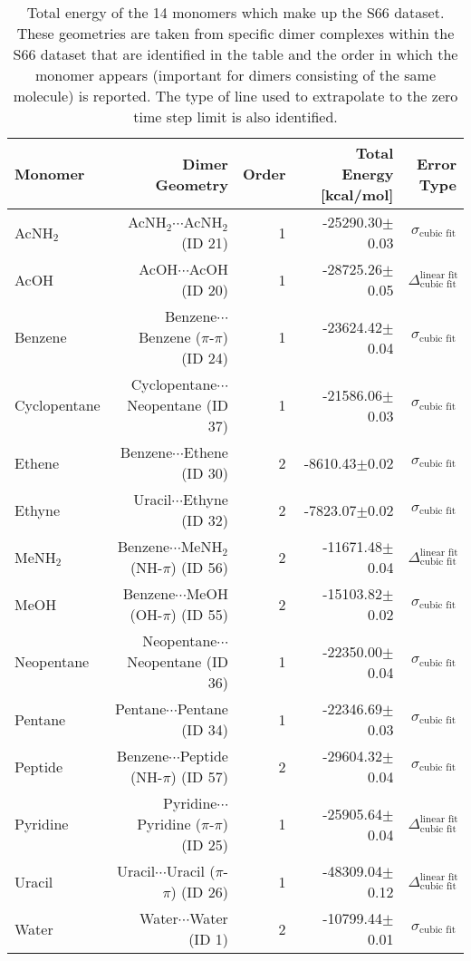 \begin{table}
\caption{\label{tab:monomer_tot_ene}Total energy of the 14 monomers which make up the S66 dataset. These geometries are taken from specific dimer complexes within the S66 dataset that are identified in the table and the order in which the monomer appears (important for dimers consisting of the same molecule) is reported. The type of line used to extrapolate to the zero time step limit is also identified.}
\begin{adjustbox}{center}
\begin{tabular}{lrrrr}
\toprule
Monomer & Dimer Geometry & Order & Total Energy [kcal/mol] & Error Type \\ 
\midrule
AcNH$_2$ & AcNH$_2$$\cdots$AcNH$_2$ (ID 21) & 1 & -25290.30$\pm$0.03 & $\sigma_\text{cubic fit}$ \\
AcOH & AcOH$\cdots$AcOH (ID 20) & 1 & -28725.26$\pm$0.05 & $\Delta_\text{cubic fit}^\text{linear fit}$ \\
Benzene & Benzene$\cdots$Benzene ($\pi$-$\pi$) (ID 24) & 1 & -23624.42$\pm$0.04 & $\sigma_\text{cubic fit}$ \\
Cyclopentane & Cyclopentane$\cdots$Neopentane (ID 37) & 1 & -21586.06$\pm$0.03 & $\sigma_\text{cubic fit}$ \\
Ethene & Benzene$\cdots$Ethene (ID 30) & 2 & -8610.43$\pm$0.02 & $\sigma_\text{cubic fit}$ \\
Ethyne & Uracil$\cdots$Ethyne (ID 32) & 2 & -7823.07$\pm$0.02 & $\sigma_\text{cubic fit}$ \\
MeNH$_2$ & Benzene$\cdots$MeNH$_2$ (NH-$\pi$) (ID 56) & 2 & -11671.48$\pm$0.04 & $\Delta_\text{cubic fit}^\text{linear fit}$ \\
MeOH & Benzene$\cdots$MeOH (OH-$\pi$) (ID 55) & 2 & -15103.82$\pm$0.02 & $\sigma_\text{cubic fit}$ \\
Neopentane & Neopentane$\cdots$Neopentane (ID 36) & 1 & -22350.00$\pm$0.04 & $\sigma_\text{cubic fit}$ \\
Pentane & Pentane$\cdots$Pentane (ID 34) & 1 & -22346.69$\pm$0.03 & $\sigma_\text{cubic fit}$ \\
Peptide & Benzene$\cdots$Peptide (NH-$\pi$) (ID 57) & 2 & -29604.32$\pm$0.04 & $\sigma_\text{cubic fit}$ \\
Pyridine & Pyridine$\cdots$Pyridine ($\pi$-$\pi$) (ID 25) & 1 & -25905.64$\pm$0.04 & $\Delta_\text{cubic fit}^\text{linear fit}$ \\
Uracil & Uracil$\cdots$Uracil ($\pi$-$\pi$) (ID 26) & 1 & -48309.04$\pm$0.12 & $\Delta_\text{cubic fit}^\text{linear fit}$ \\
Water & Water$\cdots$Water (ID 1) & 2 & -10799.44$\pm$0.01 & $\sigma_\text{cubic fit}$ \\
\bottomrule
\end{tabular}
\end{adjustbox}
\end{table}